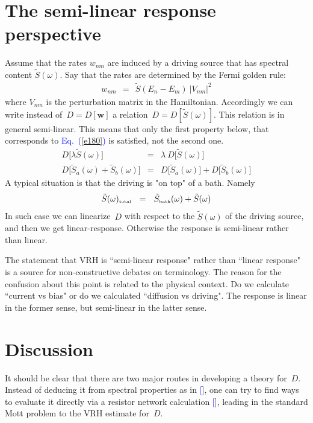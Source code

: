 \documentclass[aps,prb,floats,floatfix,twocolumn]{revtex4}
\newcommand{\tbox}[1]{\mbox{\tiny #1}}
\newcommand{\beq}{\begin{eqnarray}}
\newcommand{\eeq}{\end{eqnarray}}
\newcommand{\Eq}[1]{\textcolor{blue}{Eq.\!\!~(\ref{#1})}}
\renewcommand{\cite}[1]{\textcolor{blue}{[\onlinecite{#1}}]} %
\begin{document}
\section{The semi-linear response perspective}

Assume that the rates $w_{nm}$ are induced 
by a driving source that has spectral content $\tilde{S}(\omega)$. 
Say that the rates are determined by the Fermi golden rule:
%
\beq
w_{nm} \ \ = \ \ \tilde{S}(E_n-E_m) \ |V_{nm}|^2
\eeq
%
where $V_{nm}$ is the perturbation matrix in the Hamiltonian.
Accordingly we can write instead of~$D=D[\bm{w}]$ 
a relation~$D=D[\tilde{S}(\omega)]$.
This relation is in general semi-linear. 
This means that only the first property below, 
that corresponds to \Eq{e180} is satisfied, 
not the second one.
%
\beq
D\big[ \lambda \tilde{S}(\omega)\big]  &=&   \lambda \ D\big[\tilde{S}(\omega)\big] 
\\
D\big[\tilde{S}_a(\omega) + \tilde{S}_b(\omega)\big]  &=&  D\big[\tilde{S}_a(\omega)\big] + D\big[\tilde{S}_b(\omega)\big]
\eeq
%
A typical situation is that the driving is "on top" of a bath. Namely 
%
\beq
\tilde{S}(\omega)_{\tbox{total}} \ \ = \ \ \tilde{S}_{\tbox{bath}}(\omega) + \tilde{S}(\omega)
\eeq  
%
In such case we can linearize~$D$ with respect to the $\tilde{S}(\omega)$  
of the driving source, and then we get linear-response. 
Otherwise the response is semi-linear rather than linear. 

The statement that VRH is ``semi-linear response" rather than ``linear response"
is a source for non-constructive debates on terminology. The reason for the 
confusion about this point is related to the physical context. 
Do we calculate ``current vs bias" or do we calculated ``diffusion vs driving".
The response is linear in the former sense, but semi-linear in the latter sense.




\section{Discussion}

It should be clear that there are two major routes in developing  
a theory for~$D$. Instead of deducing it from spectral properties 
as in \cite{amir}, one can try to find ways to evaluate it directly 
via a resistor network calculation \cite{miller,AHL,Halp,pollak,VRHbook}, 
leading in the standard Mott problem to the VRH estimate for~$D$.   
\end{document}
